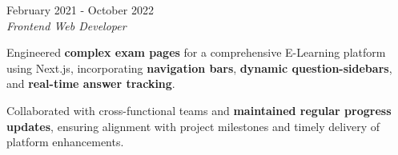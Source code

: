 \documentclass[../main.tex]{subfiles}
\begin{document}
\vspace{0.4 cm}

\begin{twocolentry}{February 2021 - October 2022}
     \\
    \vspace{0.10 cm}
    \textit{Frontend Web Developer}
\end{twocolentry}

\vspace{0.10 cm}
\begin{onecolentry}
\begin{highlights}
    \item Engineered \textbf{complex exam pages} for a comprehensive E-Learning platform using Next.js, incorporating \textbf{navigation bars}, \textbf{dynamic question-sidebars}, and \textbf{real-time answer tracking}.
    \item Collaborated with cross-functional teams and \textbf{maintained regular progress updates}, ensuring alignment with project milestones and timely delivery of platform enhancements.
\end{highlights}
\end{onecolentry}
\end{document}
